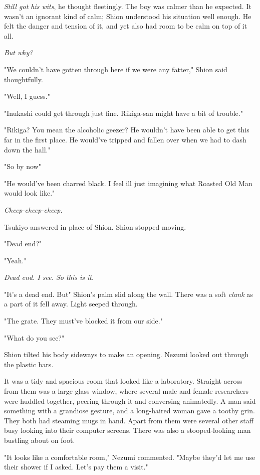 \emph{Still got his wits}, he thought fleetingly. The boy was calmer than he
expected. It wasn't an ignorant kind of calm; Shion understood his
situation well enough. He felt the danger and tension of it, and yet
also had room to be calm on top of it all.

\emph{But why?}

"We couldn't have gotten through here if we were any fatter," Shion said
thoughtfully.

"Well, I guess."

"Inukashi could get through just fine. Rikiga-san might have a bit of
trouble."

"Rikiga? You mean the alcoholic geezer? He wouldn't have been able to
get this far in the first place. He would've tripped and fallen over
when we had to dash down the hall."

"So by now\el "

"He would've been charred black. I feel ill just imagining what Roasted
Old Man would look like."

\emph{Cheep-cheep-cheep.}

Tsukiyo answered in place of Shion. Shion stopped moving.

"Dead end?"

"Yeah."

\emph{Dead end. I see. So this is it.}

"It's a dead end. But\el " Shion's palm slid along the wall. There was a
soft \emph{clunk} as a part of it fell away. Light seeped through.

"The grate. They must've blocked it from our side."

"What do you see?"

Shion tilted his body sideways to make an opening. Nezumi looked out
through the plastic bars.

It was a tidy and spacious room that looked like a laboratory. Straight
across from them was a large glass window, where several male and female
researchers were huddled together, peering through it and conversing
animatedly. A man said something with a grandiose gesture, and a
long-haired woman gave a toothy grin. They both had steaming mugs in
hand. Apart from them were several other staff busy looking into their
computer screens. There was also a stooped-looking man bustling about on
foot.

"It looks like a comfortable room," Nezumi commented. "Maybe they'd let
me use their shower if I asked. Let's pay them a visit."

